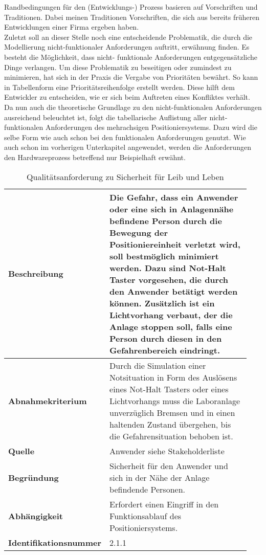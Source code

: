 \documentclass[../Bachelorarbeit.tex]{subfiles}
\begin{document}
Randbedingungen für den (Entwicklungs-) Prozess basieren auf Vorschriften und Traditionen. Dabei meinen Traditionen Vorschriften, die sich aus bereits früheren Entwicklungen einer Firma ergeben haben.\\ %
Zuletzt soll an dieser Stelle noch eine entscheidende Problematik, die durch die Modellierung nicht-funktionaler Anforderungen auftritt, erwähnung finden. Es besteht die Möglichkeit, dass nicht- funktionale Anforderungen entgegensätzliche Dinge verlangen. Um diese Problematik zu beseitigen oder zumindest zu minimieren, hat sich in der Praxis die Vergabe von Prioritäten bewährt. So kann in Tabellenform eine Prioritätsreihenfolge erstellt werden. Diese hilft dem Entwickler zu entscheiden, wie er sich beim Auftreten eines Konfliktes verhält.\\ %
Da nun auch die theoretische Grundlage zu den nicht-funktionalen Anforderungen ausreichend beleuchtet ist, folgt die tabellarische Auflistung aller nicht-funktionalen Anforderungen des mehrachsigen Positioniersystems. Dazu wird die selbe Form wie auch schon bei den funktionalen Anforderungen genutzt. Wie auch schon im vorherigen Unterkapitel angewendet, werden die Anforderungen den Hardwareprozess betreffend nur Beispielhaft erwähnt.

\begin{table}[H]
    \centering
    \begin{tabular}{| p{0.34\linewidth} | p{0.6\linewidth} |}
        \hline
        \textbf{Beschreibung} & Die Gefahr, dass ein Anwender oder eine sich in Anlagennähe befindene Person durch die Bewegung der Positioniereinheit verletzt wird, soll bestmöglich minimiert werden. Dazu sind Not-Halt Taster vorgesehen, die durch den Anwender betätigt werden können. Zusätzlich ist ein Lichtvorhang verbaut, der die Anlage stoppen soll, falls eine Person durch diesen in den Gefahrenbereich eindringt. \\ \hline
        \textbf{Abnahmekriterium} & Durch die Simulation einer Notsituation in Form des Auslösens eines Not-Halt Tasters oder eines Lichtvorhangs muss die Laboranlage unverzüglich Bremsen und in einen haltenden Zustand übergehen, bis die Gefahrensituation behoben ist. \\ \hline
        \textbf{Quelle} & Anwender siehe Stakeholderliste \\ \hline
        \textbf{Begründung} & Sicherheit für den Anwender und sich in der Nähe der Anlage befindende Personen. \\ \hline
        \textbf{Abhängigkeit} & Erfordert einen Eingriff in den Funktionsablauf des Positioniersystems. \\ \hline
        \textbf{Identifikationsnummer} & 2.1.1 \\ \hline
    \end{tabular}
    \caption[\acs{nfa} - Sicherheit für Leib und Leben]{Qualitätsanforderung zu Sicherheit für Leib und Leben}
    \label{tab:my-table20}
\end{table}

\end{document}
